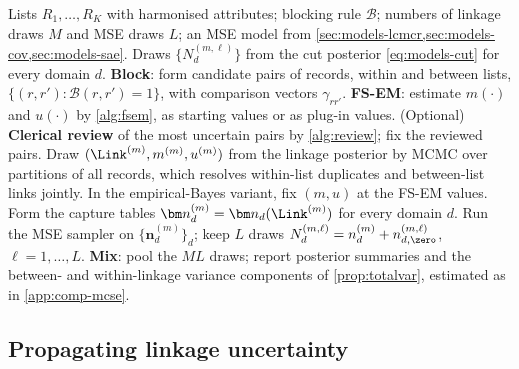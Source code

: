 \begin{algorithm}[t]
\caption{End-to-end estimation of the dark figure with propagated linkage uncertainty.}\label{alg:pipeline}
\begin{algorithmic}[1]
\Require Lists $R_1,\dots,R_K$ with harmonised attributes; blocking rule $\mathcal B$; numbers of linkage draws $M$ and MSE draws $L$; an MSE model from \cref{sec:models-lcmcr,sec:models-cov,sec:models-sae}.
\Ensure Draws $\{N_d^{(m,\ell)}\}$ from the cut posterior \eqref{eq:models-cut} for every domain $d$.
\State \textbf{Block}: form candidate pairs of records, within and between lists, $\{(r,r'):\mathcal B(r,r')=1\}$, with comparison vectors $\gamma_{rr'}$.
\State \textbf{FS-EM}: estimate $m(\cdot)$ and $u(\cdot)$ by \cref{alg:fsem}, as starting values or as plug-in values.
\State (Optional) \textbf{Clerical review} of the most uncertain pairs by \cref{alg:review}; fix the reviewed pairs.
  \State Draw $(\Link^{(m)},m^{(m)},u^{(m)})$ from the linkage posterior by MCMC over partitions of all records, which resolves within-list duplicates and between-list links jointly. In the empirical-Bayes variant, fix $(m,u)$ at the FS-EM values.
  \State Form the capture tables $\bm n_d^{(m)}=\bm n_d(\Link^{(m)})$ for every domain $d$.
  \State Run the MSE sampler on $\{\bm n_d^{(m)}\}_d$; keep $L$ draws $N_d^{(m,\ell)}=n_d^{(m)}+n_{d,\zero}^{(m,\ell)}$, $\ell=1,\dots,L$.
\EndFor
\State \textbf{Mix}: pool the $ML$ draws; report posterior summaries and the between- and within-linkage variance components of \cref{prop:totalvar}, estimated as in \cref{app:comp-mcse}.
\end{algorithmic}
\end{algorithm}

\subsection{Propagating linkage uncertainty}\label{sec:models-link}

